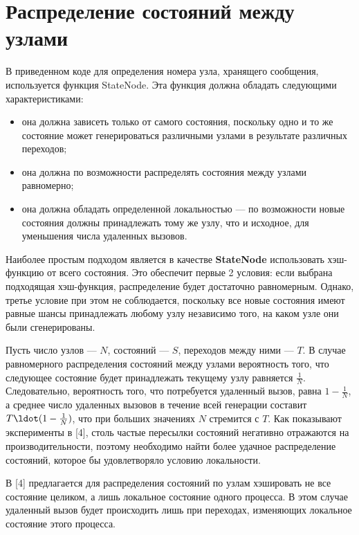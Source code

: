 \documentclass[utf8]{G7-32}
\begin{document}
\section{Распределение состояний между узлами}
\label{sec:state-partition}

В приведенном коде для определения номера узла, хранящего сообщения,
используется функция StateNode. Эта функция должна обладать следующими
характеристиками:

\begin{itemize}
\item она должна зависеть только от самого состояния, поскольку одно и
  то же состояние может генерироваться различными узлами в результате
  различных переходов;

\item она должна по возможности распределять состояния между узлами
  равномерно;

\item она должна обладать определенной локальностью — по возможности
  новые состояния должны принадлежать тому же узлу, что и исходное,
  для уменьшения числа удаленных вызовов.
\end{itemize}

Наиболее простым подходом является в качестве \textbf{StateNode} использовать
хэш-функцию от всего состояния. Это обеспечит первые 2 условия: если
выбрана подходящая хэш-функция, распределение будет достаточно
равномерным. Однако, третье условие при этом не соблюдается, поскольку
все новые состояния имеют равные шансы принадлежать любому узлу
независимо того, на каком узле они были сгенерированы.

Пусть число узлов — $N$, состояний — $S$, переходов между ними —
$T$. В случае равномерного распределения состояний между узлами
вероятность того, что следующее состояние будет принадлежать текущему
узлу равняется $\frac{1}{N}$. Следовательно, вероятность того, что
потребуется удаленный вызов, равна $1 - \frac{1}{N}$, а среднее число
удаленных вызовов в течение всей генерации составит $T \ldot (1 -
\frac{1}{N})$, что при больших значениях $N$ стремится с $T$. Как
показывают эксперименты в [4], столь частые пересылки состояний
негативно отражаются на производительности, поэтому необходимо найти
более удачное распределение состояний, которое бы удовлетворяло
условию локальности.

В [4] предлагается для распределения состояний по узлам хэшировать не
все состояние целиком, а лишь локальное состояние одного процесса. В
этом случае удаленный вызов будет происходить лишь при переходах,
изменяющих локальное состояние этого процесса.
\end{document}
